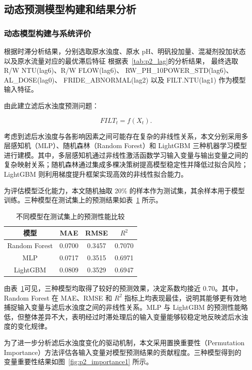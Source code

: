 \documentclass[UTF8,zihao=-4]{ctexart}
\begin{document}
\subsection{动态预测模型构建和结果分析}
\subsubsection{动态模型构建与系统评价}
根据时滞分析结果，分别选取原水浊度、原水 pH、明矾投加量、混凝剂投加状态以及原水流量对应的最优滞后特征
根据表~\ref{tab:p2_lag}的分析结果，
最终选取 R/W NTU(lag6)、R/W FLOW(lag6)、
RW\_PH\_10POWER\_STD(lag6)、
AL\_DOSE(lag0)、
FRIDE\_ABNORMAL(lag2)
以及 FILT.NTU(lag1)
作为模型输入特征。

由此建立滤后水浊度预测问题：

\[
FILT_t=f(X_t).
\]

考虑到滤后水浊度与各影响因素之间可能存在复杂的非线性关系，本文分别采用多层感知机（MLP）、随机森林（Random Forest）和 LightGBM 三种机器学习模型进行建模。其中，多层感知机通过非线性激活函数学习输入变量与输出变量之间的复杂映射关系；随机森林通过集成多棵决策树提高模型稳定性并降低过拟合风险；LightGBM 则利用梯度提升框架实现高效的非线性拟合能力。

为评估模型泛化能力，本文随机抽取 20\% 的样本作为测试集，其余样本用于模型训练。三种模型在测试集上的预测结果如表~\ref{tab:p2_model_compare} 所示。

\begin{table}[H]
\centering
\caption{不同模型在测试集上的预测性能比较}
\label{tab:p2_model_compare}
\begin{tabular}{cccc}
\toprule
模型 & MAE & RMSE & $R^2$ \\
\midrule
Random Forest & 0.0700 & 0.3457 & 0.7070 \\
MLP & 0.0717 & 0.3515 & 0.6971 \\
LightGBM & 0.0809 & 0.3529 & 0.6947 \\
\bottomrule
\end{tabular}
\end{table}

由表~\ref{tab:p2_model_compare}可见，三种模型均取得了较好的预测效果，决定系数均接近 0.70。其中，Random Forest 在 MAE、RMSE 和 $R^2$ 指标上均表现最佳，说明其能够更有效地捕捉输入变量与滤后水浊度之间的非线性关系。MLP 与 LightGBM 的预测性能略低，但整体差异不大，表明经过时滞处理后的输入变量能够较稳定地反映滤后水浊度的变化规律。


为了进一步分析滤后水浊度变化的驱动机制，本文采用置换重要性（Permutation Importance）方法评估各输入变量对模型预测结果的贡献程度。三种模型得到的变量重要性结果如图~\ref{fig:p2_importance1} 所示。
\end{document}
